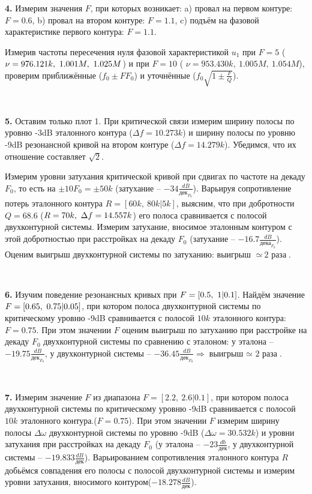 \documentclass[a4paper, 12pt, twoside]{article}
\newcommand*{\hm}[1]{#1\nobreak\discretionary{}
	{\hbox{$\mathsurround=0pt #1$}}{}}
\begin{document}
\textbf{4.} Измерим значения $F$, при которых возникает: a) провал на первом контуре: $F = 0.6$, b) провал на втором контуре: $F = 1.1$, c) подъём на фазовой характеристике первого контура: $F = 1.1$.

Измерив частоты пересечения нуля фазовой характеристикой $u_1$ при $F = 5$ ($\nu \hm{=} 976.121k,~1.001M,~1.025M$) и при $F = 10$ ( $\nu = 953.430k,~1.005M,~1.054M$), проверим приближённые ($f_0\pm FF_0$) и уточнённые ($f_0\sqrt{1\pm\frac{F}{Q}}$).

~

\textbf{5.} Оставим только плот 1. При критической связи измерим ширину полосы по уровню -3dB эталонного контура ($\Delta f = 10.273k$) и ширину полосы по уровню -9dB резонансной кривой на втором контуре ($\Delta f = 14.279k$). Убедимся, что их отношение составляет $\sqrt{2}$.

Измерим уровни затухания критической кривой при сдвигах по частоте на декаду $F_0$, то есть на $\pm 10F_0 = \pm 50k$ (затухание -- $-34\frac{dB}{\text{дек}_{F_0}}$). Варьируя сопротивление потерь эталонного контура $R = [60k,~80k|5k]$, выясним, что при добротности $Q = 68.6$ ($R \hm{=} 70k,~\Delta f = 14.557k$) его полоса сравнивается с полосой двухконтурной системы. Измерим затухание, вносимое эталонным контуром с этой добротностью при расстройках на декаду $F_0$ (затухание -- $-16.7\frac{dB}{\text{дека}_{F_0}}$). Оценим выигрыш двухконтурной системы по затуханию: выигрыш $\simeq~\text{2 раза}$.

~

\textbf{6.} Изучим поведение резонансных кривых при $F \hm{=} [0.5,~1|0.1]$. Найдём значение $F \hm{=} [0.65,~0.75|0.05]$, при котором полоса двухконтурной системы по критическому уровню -9dB сравнивается с полосой $10k$ эталонного контура: $F = 0.75$. При этом значении $F$ оценим выигрыш по затуханию при расстройке на декаду $F_0$ двухконтурной системы по сравнению с эталоном: у эталона -- $-19.75\frac{dB}{\text{дек}_{F_0}}$, у двухконтурной системы -- $-36.45\frac{dB}{\text{дек}_{F_0}} \Longrightarrow \text{выигрыш $\simeq$ 2 раза}$.

~

\textbf{7.} Измерим значение $F$ из диапазона $F = [2.2,~2.6|0.1]$, при котором полоса двухконтурной системы по критическому уровню -9dB сравнивается с полосой $10k$ эталонного контура.($F = 0.75$). При этом значении $F$ измерим ширину полосы $\Delta \omega$ двухконтурной системы по уровню -9dB ($\Delta \omega = 30.532k$) и уровни затухания при расстройках на декаду $F_0$ (у эталона -- $-23\frac{db}{\text{дек}}$, у двухконтурной системы -- $-19.833\frac{dB}{\text{дек}}$). Варьированием сопротивления эталонного контура $R$ добьёмся совпадения его полосы с полосой двухконтурной системы и измерим уровни затухания, вносимого контуром($-18.278\frac{dB}{\text{дек}}$).
\end{document}
